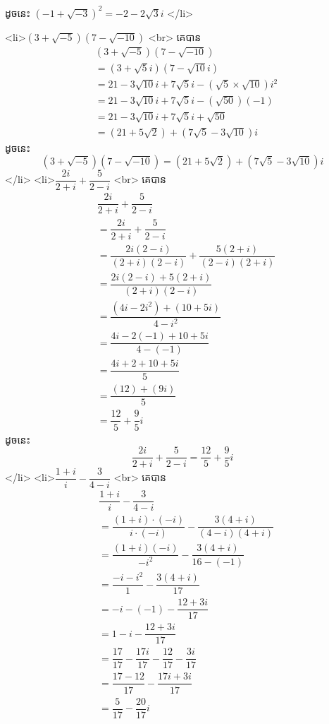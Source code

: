             ដូចនេះ $\boxed{\left( -1+\sqrt{-3}\right)^2 = -2 - 2\sqrt{3}i}$
        </li>
        
        <li>$\left( 3+\sqrt{-5}\right)\left( 7-\sqrt{-10}\right)$
            <br>
            គេបាន
            $$
            \begin{aligned}
            &\left( 3+\sqrt{-5}\right)\left( 7-\sqrt{-10}\right) \\
            &= (3 + \sqrt{5}i)(7 - \sqrt{10}i) \\
            &= 21 - 3\sqrt{10}i + 7\sqrt{5}i - (\sqrt{5} \times \sqrt{10})i^2 \\
            &= 21 - 3\sqrt{10}i + 7\sqrt{5}i - (\sqrt{50})(-1) \\
            &= 21 - 3\sqrt{10}i + 7\sqrt{5}i + \sqrt{50} \\
            &= (21 + 5\sqrt{2}) + (7\sqrt{5} - 3\sqrt{10})i
            \end{aligned}
            $$
            ដូចនេះ $$\boxed{\left( 3+\sqrt{-5}\right)\left( 7-\sqrt{-10}\right) = (21 + 5\sqrt{2}) + (7\sqrt{5} - 3\sqrt{10})i}$$
        </li>
        <li>$\dfrac{2i}{2+i}+\dfrac{5}{2-i}$
            <br>
            គេបាន
            $$
            \begin{aligned}
            &\dfrac{2i}{2+i}+\dfrac{5}{2-i} \\
            &= \dfrac{2i}{2+i} + \dfrac{5}{2-i} \\
            &= \dfrac{2i(2-i)}{(2+i)(2-i)} + \dfrac{5(2+i)}{(2-i)(2+i)} \\
            &= \dfrac{2i(2-i) + 5(2+i)}{(2+i)(2-i)} \\
            &= \dfrac{(4i - 2i^2) + (10 + 5i)}{4 - i^2} \\
            &= \dfrac{4i - 2(-1) + 10 + 5i}{4 - (-1)} \\
            &= \dfrac{4i + 2 + 10 + 5i}{5} \\
            &= \dfrac{(12) + (9i)}{5} \\
            &= \dfrac{12}{5} + \dfrac{9}{5}i
            \end{aligned}
            $$
            ដូចនេះ $$\boxed{\dfrac{2i}{2+i}+\dfrac{5}{2-i} = \dfrac{12}{5} + \dfrac{9}{5}i}$$
        </li>
        <li>$\dfrac{1+i}{i}-\dfrac{3}{4-i}$
            <br>
            គេបាន
            $$
            \begin{aligned}
            &\dfrac{1+i}{i} - \dfrac{3}{4-i} \\
            &= \dfrac{(1+i)\cdot (-i)}{i \cdot (-i)} - \dfrac{3(4+i)}{(4-i)(4+i)} \\
            &= \dfrac{(1+i)(-i)}{-i^2} - \dfrac{3(4+i)}{16 - (-1)} \\
            &= \dfrac{-i - i^2}{1} - \dfrac{3(4+i)}{17} \\
            &= -i - (-1) - \dfrac{12 + 3i}{17} \\
            &= 1 - i - \dfrac{12 + 3i}{17} \\
            &= \dfrac{17}{17} - \dfrac{17i}{17} - \dfrac{12}{17} - \dfrac{3i}{17} \\
            &= \dfrac{17 - 12}{17} - \dfrac{17i + 3i}{17} \\
            &= \dfrac{5}{17} - \dfrac{20}{17}i
            \end{aligned}
            $$

